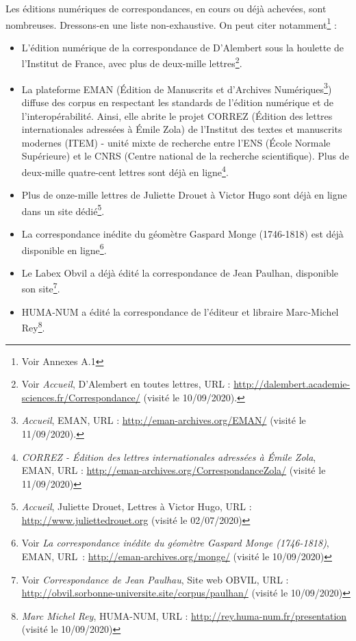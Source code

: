 Les éditions numériques de correspondances, en cours ou déjà achevées, sont nombreuses. Dressons-en une liste non-exhaustive. On peut citer notamment\footnote{Voir Annexes A.1} :
\begin{itemize}
    \item L'édition numérique de la correspondance de D'Alembert sous la houlette de l'Institut de France, avec plus de deux-mille lettres\footnote{Voir \emph{Accueil}, D'Alembert en toutes lettres, URL : \url{http://dalembert.academie-sciences.fr/Correspondance/} (visité le 10/09/2020).}.
    \item La plateforme EMAN (Édition de Manuscrits et d'Archives Numériques\footnote{\emph{Accueil}, EMAN, URL : \url{http://eman-archives.org/EMAN/} (visité le 11/09/2020).})
diffuse des corpus en respectant les standards de l'édition numérique et de l'interopérabilité. Ainsi, elle abrite le projet CORREZ (Édition des lettres internationales adressées à Émile Zola) de 
    l'Institut des textes et manuscrits modernes (ITEM) - unité mixte de recherche entre l'ENS (École Normale Supérieure) et le CNRS (Centre national de la recherche scientifique). Plus de deux-mille quatre-cent lettres sont déjà en ligne\footnote{\emph{CORREZ - Édition des lettres internationales adressées à Émile Zola}, EMAN, URL : \url{http://eman-archives.org/CorrespondanceZola/} (visité le 11/09/2020)}.
   \item Plus de onze-mille lettres de Juliette Drouet à Victor Hugo sont déjà en ligne dans un site dédié\footnote{\emph{Accueil}, Juliette Drouet, Lettres à Victor Hugo, URL : \url{http://www.juliettedrouet.org} (visité le 02/07/2020)}.
    \item La correspondance inédite du géomètre Gaspard Monge (1746-1818) est déjà disponible en ligne\footnote{Voir \emph{La correspondance inédite du géomètre Gaspard Monge (1746-1818)}, EMAN, URL~: \url{http://eman-archives.org/monge/} (visité le 10/09/2020)}.
    \item Le Labex Obvil a déjà édité la correspondance de Jean Paulhan, disponible son site\footnote{Voir \emph{Correspondance de Jean Paulhau}, Site web OBVIL, URL : \url{http://obvil.sorbonne-universite.site/corpus/paulhan/} (visité le 10/09/2020)}.
    \item HUMA-NUM a édité la correspondance de l'éditeur et libraire Marc-Michel Rey\footnote{\emph{Marc Michel Rey}, HUMA-NUM, URL : \url{http://rey.huma-num.fr/presentation} (visité le 10/09/2020)}.
\end{itemize}

